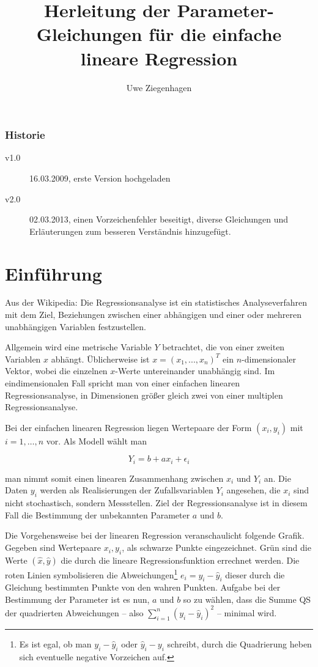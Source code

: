 \documentclass{scrartcl}
\title{Herleitung der Parameter-Gleichungen für die einfache lineare Regression}
\author{Uwe Ziegenhagen}
\begin{document}
\maketitle

\subsubsection*{Historie}

\begin{description}
\item[v1.0] 16.03.2009, erste Version hochgeladen
\item[v2.0] 02.03.2013, einen Vorzeichenfehler beseitigt, diverse Gleichungen und Erläuterungen zum besseren Verständnis hinzugefügt.
\end{description}

\section{Einführung}

Aus der Wikipedia: Die Regressionsanalyse ist ein statistisches Analyseverfahren mit dem Ziel, Beziehungen zwischen einer abhängigen und einer oder mehreren unabhängigen Variablen festzustellen. 

Allgemein wird eine metrische Variable $Y$ betrachtet, die von einer zweiten Variablen $x$ abhängt. Üblicherweise ist $x=(x_1,...,x_n)^T$ ein $n$-dimensionaler Vektor, wobei die einzelnen $x$-Werte untereinander unabhängig sind. Im eindimensionalen Fall spricht man von einer einfachen linearen Regressionsanalyse, in Dimensionen größer gleich zwei von einer multiplen Regressionsanalyse.

Bei der einfachen linearen Regression liegen Wertepaare der Form $(x_i, y_i)$ mit $ i=1,\ldots, n$ vor. Als Modell wählt man
    
\begin{equation}
	 Y_i = b + a x_i + \epsilon_i
\end{equation}
   
man nimmt somit einen linearen Zusammenhang zwischen $x_i$ und $Y_i$ an. Die Daten $y_i$ werden als Realisierungen der Zufallsvariablen $Y_i$ angesehen, die $x_i$ sind nicht stochastisch, sondern Messstellen. Ziel der Regressionsanalyse ist in diesem Fall die Bestimmung der unbekannten Parameter $a$ und $b$.

Die Vorgehensweise bei der linearen Regression veranschaulicht folgende Grafik. Gegeben sind Wertepaare $x_i,y_i$, als schwarze Punkte eingezeichnet. Grün sind die Werte $(\hat{x},\hat{y})$ die durch die lineare Regressionsfunktion errechnet werden. Die roten Linien symbolisieren die Abweichungen\footnote{Es ist egal, ob man $y_i-\hat{y}_i$ oder $\hat{y}_i-y_i$ schreibt, durch die Quadrierung heben sich eventuelle negative Vorzeichen auf.}  $e_i=y_i-\hat{y}_i$ dieser durch die Gleichung bestimmten Punkte von den wahren Punkten. Aufgabe bei der Bestimmung der Parameter ist es nun, $a$ und $b$ so zu wählen, dass die Summe QS der quadrierten Abweichungen -- also $\sum_{i=1}^n (y_i-\hat{y}_i)^2$ -- minimal wird. 
\end{document}
